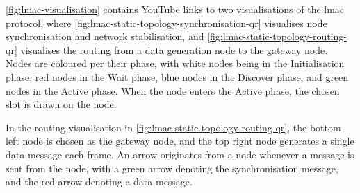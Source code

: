 \autoref{fig:lmac-visualisation} contains YouTube links to two visualisations of the \gls{lmac} protocol,
where \autoref{fig:lmac-static-topology-synchronisation-qr} visualises node synchronisation and network
stabilisation, and \autoref{fig:lmac-static-topology-routing-qr} visualises the routing from a data generation
node to the gateway node. Nodes are coloured per their phase, with white nodes being in the Initialisation
phase, red nodes in the Wait phase, blue nodes in the Discover phase, and green nodes in the Active phase.
When the node enters the Active phase, the chosen slot is drawn on the node. \medbreak

In the routing visualisation in \autoref{fig:lmac-static-topology-routing-qr}, the bottom left node is chosen
as the gateway node, and the top right node generates a single data message each frame. An arrow originates
from a node whenever a message is sent from the node, with a green arrow denoting the synchronisation message,
and the red arrow denoting a data message.

